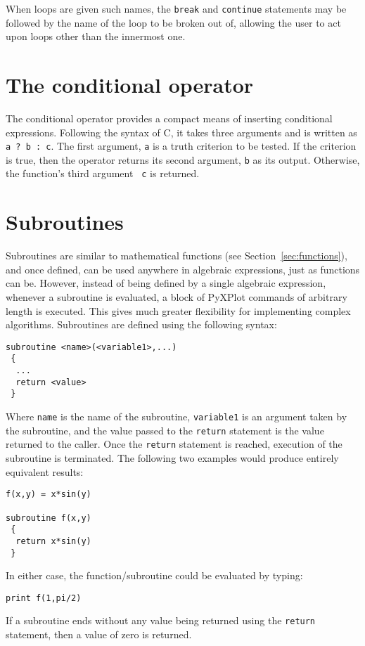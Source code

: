 \noindent When loops are given such names, the {\tt break} and {\tt continue}
statements may be followed by the name of the loop to be broken out of,
allowing the user to act upon loops other than the innermost one.

\section{The conditional operator}

The conditional operator provides a compact means of inserting conditional
expressions.  Following the syntax of C, it takes three arguments and is
written as {\tt a ? b : c}. The first argument, {\tt a} is a truth criterion to
be tested. If the criterion is true, then the operator returns its second
argument, {\tt b} as its output. Otherwise, the function's third argument {\tt
c} is returned.

\vspace{2mm}


\section{Subroutines}
\label{sec:subroutines}

Subroutines are similar to mathematical functions (see
Section~\ref{sec:functions}), and once defined, can be used anywhere in
algebraic expressions, just as functions can be.  However, instead of being
defined by a single algebraic expression, whenever a subroutine is evaluated, a
block of PyXPlot commands of arbitrary length is executed. This gives much
greater flexibility for implementing complex algorithms. Subroutines are
defined using the following syntax:
\begin{verbatim}
subroutine <name>(<variable1>,...)
 {
  ...
  return <value>
 }
\end{verbatim}
Where {\tt name} is the name of the subroutine, {\tt variable1} is an argument
taken by the subroutine, and the value passed to the {\tt return} statement is
the value returned to the caller. Once the {\tt return} statement is reached,
execution of the subroutine is terminated. The following two examples would
produce entirely equivalent results:
\begin{verbatim}
f(x,y) = x*sin(y)

subroutine f(x,y)
 {
  return x*sin(y)
 }
\end{verbatim}
In either case, the function/subroutine could be evaluated by typing:
\begin{verbatim}
print f(1,pi/2)
\end{verbatim}
If a subroutine ends without any value being returned using the {\tt return}
statement, then a value of zero is returned.

